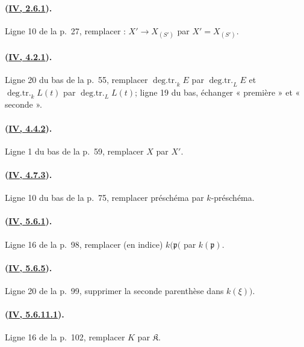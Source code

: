 \paragraph{({\texorpdfstring{\protect\hyperref[canon-index.ega4.c04.prop.2-6-1]{IV, 2.6.1}}{IV, 2.6.1}}).}
Ligne 10 de la p.~27, remplacer : $X'\to X_{(S')}$ par
$X'=X_{(S')}$. 

\paragraph{({\texorpdfstring{\protect\hyperref[canon-index.ega4.c04.prop.4-2-1]{IV, 4.2.1}}{IV, 4.2.1}}).}
Ligne 20 du bas de la p.~55, remplacer
$\operatorname{deg.tr.}_kE$ par $\operatorname{deg.tr.}_LE$ et
$\operatorname{deg.tr.}_kL(t)$ par $\operatorname{deg.tr.}_LL(t)$;
ligne 19 du bas, échanger « première » et « seconde ».

\paragraph{({\texorpdfstring{\protect\hyperref[canon-index.ega4.c04.lem.4-4-2]{IV, 4.4.2}}{IV, 4.4.2}}).}
Ligne 1 du bas de la p.~59, remplacer $X$ par $X'$.

\paragraph{({\texorpdfstring{\protect\hyperref[canon-index.ega4.c04.prop.4-7-3]{IV, 4.7.3}}{IV, 4.7.3}}).}
Ligne 10 du bas de la p.~75, remplacer préschéma par $k$-préschéma.

\paragraph{({\texorpdfstring{\protect\hyperref[canon-index.ega4.c04.prop.5-6-1]{IV, 5.6.1}}{IV, 5.6.1}}).}
Ligne 16 de la p.~98, remplacer (en indice) $k(\mathfrak p($ par
$k(\mathfrak p)$.

\paragraph{({\texorpdfstring{\protect\hyperref[canon-index.ega4.c04.prop.5-6-5]{IV, 5.6.5}}{IV, 5.6.5}}).}
Ligne 20 de la p.~99, supprimer la seconde parenthèse dans $k(\xi))$.

\paragraph{({\texorpdfstring{\protect\hyperref[canon-index.ega4.c04.lem.5-6-11-1]{IV, 5.6.11.1}}{IV, 5.6.11.1}}).}
Ligne 16 de la p.~102, remplacer $K$ par $\mathfrak K$.

